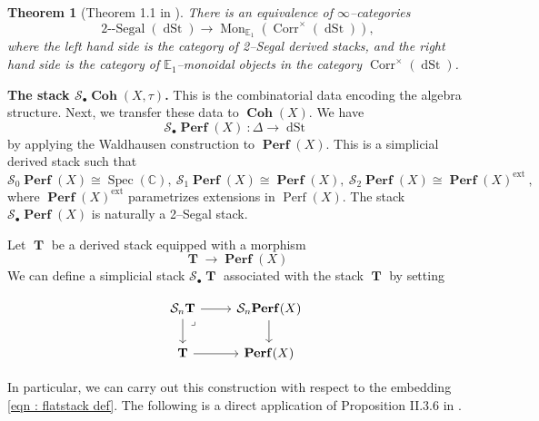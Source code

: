 \documentclass[11pt]{article}
\newtheorem{theorem}{Theorem}
\newcommand{\BC}{\mathbb{C}}
\newcommand{\segal}{\mathcal{S}}
\newcommand{\perf}{\operatorname{Perf}(X)}
\newcommand{\perfstack}{\boldsymbol{\operatorname{Perf}}(X)}
\newcommand{\cohflat}{\boldsymbol{\operatorname{Coh}}}
\newcommand{\waldhausen}{\mathcal{S}_{\bullet}}
\begin{document}
   
    \begin{theorem}[Theorem 1.1 in \cite{godicke2024infty}]\label{thm : segal monoid}
        There is an equivalence of $\infty$--categories
        \[
            \operatorname{2--Segal}(\operatorname{dSt}) \longrightarrow \operatorname{Mon}_{\mathbb{E}_1}(\operatorname{Corr}^{\times}(\operatorname{dSt})), 
        \]
       where the left hand side is the category of 2--Segal derived stacks, and the right hand side is the category of $\mathbb{E}_1$--monoidal objects in the category $\operatorname{Corr}^{\times}(\operatorname{dSt})$.
    \end{theorem}

    \noindent \textbf{The stack $\waldhausen\cohflat(X,\tau)$. }This is the combinatorial data encoding the algebra structure. Next, we transfer these data to $\cohflat(X)$. We have    
    \[
        \waldhausen\perfstack\ \colon \Delta \longrightarrow \operatorname{dSt}
    \]
    by applying the {Waldhausen construction} to $\perfstack$. This is a simplicial derived stack such that 
    \[
    \segal_0\perfstack \cong \operatorname{Spec}(\BC), \ \segal_1\perfstack\cong \perfstack,\ \segal_2\perfstack \cong \perfstack^{\operatorname{ext}}\ ,
    \]
    where $\perfstack^{\operatorname{ext}}$ parametrizes extensions in $\perf$. The stack $\waldhausen\perfstack$ is naturally a { 2--Segal stack}. \newline
    
    \noindent Let $\boldsymbol{\operatorname{T}}$ be a derived stack equipped with a morphism
     \[
        \boldsymbol{\operatorname{T}} \longrightarrow \perfstack
     \]
     We can define a simplicial stack $\waldhausen\boldsymbol{\operatorname{T}}$ associated with the stack $\boldsymbol{\operatorname{T}}$ by setting

     \[\begin{tikzcd}
	{\segal_n\boldsymbol{\operatorname{T}}} & {\segal_n\perfstack} \\
	\boldsymbol{\operatorname{T}} & \perfstack
	\arrow[from=1-1, to=1-2]
	\arrow[from=1-1, to=2-1]
	\arrow[from=1-2, to=2-2]
	\arrow[""{name=0, anchor=center, inner sep=0}, from=2-1, to=2-2]
	\arrow["\lrcorner"{anchor=center, pos=0.125}, draw=none, from=1-1, to=0]
    \end{tikzcd}\]

    \noindent In particular, we can carry out this construction with respect to the embedding \eqref{eqn : flatstack def}. The following is a direct application of Proposition II.3.6 in \cite{dps}.
    
\end{document}
